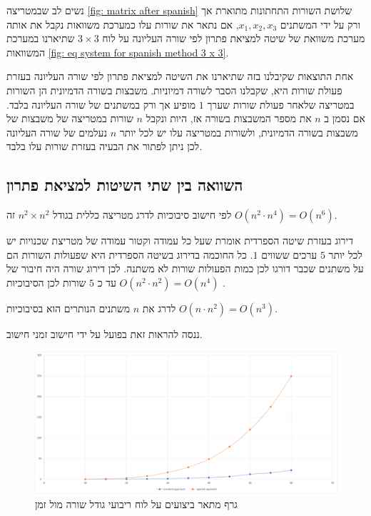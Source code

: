 \documentclass[12pt,leqno]{article}
\theoremstyle{theoremdd}
\begin{document}
נשים לב שבמטריצה 
\ref{fig: matrix after spanish}
שלושת השורות התחתונות מתוארת אך ורק על 
ידי 
המשתנים 
$x_1, x_2, x_3$,
אם נתאר את שורות עלו כמערכת משוואות נקבל
את אותה מערכת משוואת של 
שיטה למציאת פתרון לפי שורה העליונה על לוח 
$3 \times 3$
שתיארנו במערכת המשוואות
\ref{fig: eq system for spanish method 3 x 3}.

אחת התוצאות שקיבלנו בזה שתיארנו את השיטה למציאת פתרון לפי שורה העליונה 
בעזרת פעולת שורות היא, שקבלנו הסבר לשורה דמיוניות.
משבצות בשורה הדמיונית 
הן השורות במטריצה
שלאחר פעולת שורות 
שערך
$1$
מופיע אך ורק במשתנים של שורה העליונה בלבד.
אם נסמן ב
$n$
את מספר המשבצות בשורה אז,
היות ונקבל 
$n$
שורות במטריצה של משבצות של משבצות בשורה הדמיונית,
ולשורות במטריצה עלו יש לכל יותר 
$n$
נעלמים של שורה העליונה לכן ניתן לפתור את הבעיה 
בעזרת
שורות עלו בלבד.





\subsection{השוואה בין שתי השיטות למציאת פתרון}
לפי חישוב סיבוכיות
לדרג מטריצה 
כללית
בגודל 
$n^2 \times n^2$
זה 
$O(n^2 \cdot n^4) = O(n^6)$.

דירוג בעזרת שיטה הספרדית אומרת
שעל כל עמודה 
וקטור עמודה 
של מטריצת שכנויות
יש לכל יותר
$5$
ערכים ששווים 
$1$.
כל החוכמה בדירוג בשיטה הספרדית היא 
שפעולות השורות הם על משתנים שכבר דורגו
לכן 
כמות הפעולות שורות לא משתנה.
לכן דירוג שורה היה חיבור 
של עד כ
$5$
שורות
לכן הסיבוכיות 
$O(n^2 \cdot n^2) = O(n^4)$
.

לדרג את
$n$
משתנים  
הנותרים
הוא בסיבוכיות 
$O(n \cdot n^2) = O (n^3)$.

ננסה להראות זאת בפועל על ידי חישוב זמני חישוב.

\begin{figure}[ht]
    \caption{ 
    גרף מתאר ביצועים על לוח ריבועי גודל שורה מול זמן
    }
    \label{fig:prefofmance_diagram}
    \centering
    \includegraphics[width=\textwidth,height=\textheight,keepaspectratio]{images/benchmark.png}
\end{figure}
\end{document}
